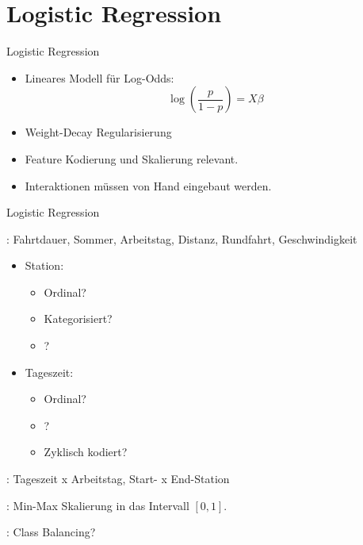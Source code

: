 \section{Logistic Regression}

\begin{frame}{Logistic Regression}
{
\begin{itemize}
\item Lineares Modell für Log-Odds:
\begin{equation}
\log(\frac{p}{1-p}) = X\beta
\end{equation}
\item Weight-Decay Regularisierung
\item Feature Kodierung und Skalierung relevant.
\item Interaktionen müssen von Hand eingebaut werden.
\end{itemize}
}
\end{frame}

\begin{frame}{Logistic Regression}
{
: Fahrtdauer, Sommer, Arbeitstag, Distanz, Rundfahrt, Geschwindigkeit
\vspace{-0.4cm}
\begin{multicols}{2}
\begin{itemize}
\item Station:
\begin{itemize}
\item Ordinal?
\item Kategorisiert?
\item {}?
\end{itemize}
\item Tageszeit:
\begin{itemize}
\item Ordinal?
\item {}?
\item Zyklisch kodiert?
\end{itemize}
\end{itemize}
\end{multicols}

: Tageszeit x Arbeitstag, Start- x End-Station

: Min-Max Skalierung in das Intervall $[0,1]$.

: Class Balancing?

}
\end{frame}

